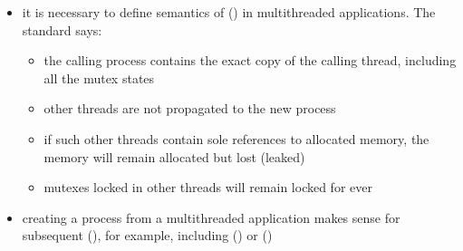 \begin{slide}
\prgchars
\begin{itemize}
\item it is necessary to define semantics of () in multithreaded
applications.  The standard says:

\begin{itemize}
\item the calling process contains the exact copy of the calling thread,
including all the mutex states
\item other threads are not propagated to the new process
\item if such other threads contain sole references to allocated memory, the
memory will remain allocated but lost (leaked)
\item mutexes locked in other threads will remain locked for ever
\end{itemize}
\item creating a process from a multithreaded application makes sense for
subsequent (), for example,  including () or
()
\end{itemize}
\end{slide}


